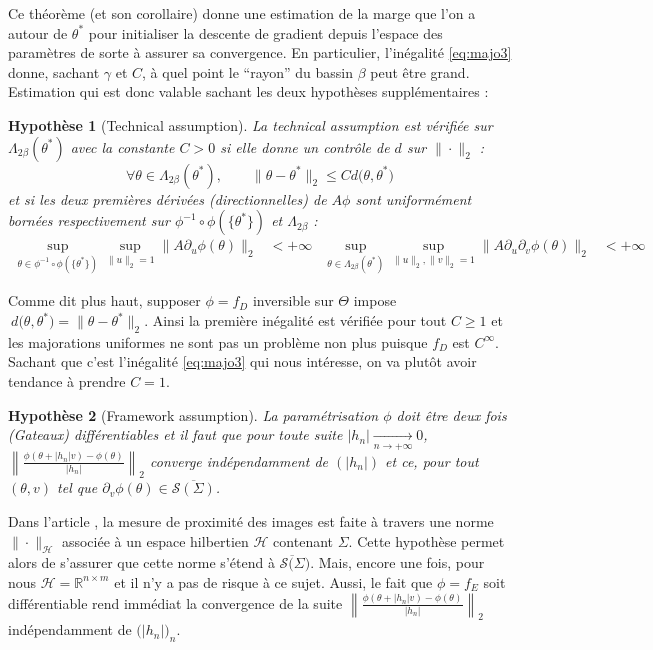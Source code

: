 \documentclass[hidelinks, french]{article} %
\newcommand{\R}{\mathbb{R}}
\newcommand{\lr}{\longrightarrow}
\renewcommand{\leq}{\leqslant}
\renewcommand{\geq}{\geqslant}
\theoremstyle{enonce}
\newtheorem{assump}{Hypothèse}
\theoremstyle{special}
\theoremstyle{rq}
\theoremstyle{exo}
\theoremstyle{demo}
\begin{document}
Ce théorème (et son corollaire) donne une estimation de la marge que l'on a autour de $\theta^*$ pour initialiser la descente de gradient depuis l'espace des paramètres de sorte à assurer sa convergence. En particulier, l'inégalité \ref{eq:majo3} donne, sachant $\gamma$ et $C$, à quel point le ``rayon'' du bassin $\beta$ peut être grand.
Estimation qui est donc valable sachant les deux hypothèses supplémentaires :
\\
\begin{assump}[Technical assumption]\label{hyp:technical}
	La \emph{technical assumption} est vérifiée sur $\Lambda_{2\beta}(\theta^*)$ avec la constante $C>0$ si elle donne un contrôle de $d$ sur $\|\cdot\|_2$ :
	\[\forall\theta\in\Lambda_{2\beta}(\theta^*),\qquad \big\|\theta-\theta^*\big\|_2\leq C d\big(\theta, \theta^*\big)\]
	et si les deux premières dérivées (directionnelles) de $A\phi$ sont uniformément bornées respectivement sur $\phi^{-1}\circ\phi(\{\theta^*\})$ et $\Lambda_{2\beta}$ :
	\begin{align*}\sup_{\theta\in\phi^{-1}\circ\phi(\{\theta^*\})}\sup_{\|u\|_2=1}\big\|A\partial_u\phi(\theta)\big\|_2&<+\infty  &  \sup_{\theta\in\Lambda_{2\beta}(\theta^*)}\sup_{\|u\|_2,\|v\|_2=1}\big\|A\partial_u\partial_v\phi(\theta)\big\|_2&<+\infty
	\end{align*}
\end{assump}

Comme dit plus haut, supposer $\phi=f_D$ inversible sur $\Theta$ impose $\ d\big(\theta, \theta^*\big)=\big\|\theta-\theta^*\big\|_2$. Ainsi la première inégalité est vérifiée pour tout $C\geq1$ et les majorations uniformes ne sont pas un problème non plus puisque $f_D$ est $C^\infty$. Sachant que c'est l'inégalité \ref{eq:majo3} qui nous intéresse, on va plutôt avoir tendance à prendre $C=1$.
\\

\begin{assump}[Framework assumption]\label{hyp:framework}
	La paramétrisation $\phi$ doit être deux fois (Gateaux) différentiables et il faut que pour toute suite $|h_n|\xrightarrow[n\lr+\infty]{} 0$, $\left\|\frac{\phi(\theta +|h_n|v)-\phi(\theta)}{|h_n|}\right\|_2$ converge indépendamment de $(|h_n|)$ et ce, pour tout $(\theta,v)$ tel que $\partial_v\phi(\theta)\in\overline{\mathcal{S}(\Sigma)}$.
\end{assump}

Dans l'article \cite{traonmilin_basins_2022}, la mesure de proximité des images est faite à travers une norme $\|\cdot\|_\mathcal{H}$ associée à un espace hilbertien $\mathcal{H}$ contenant $\Sigma$. Cette hypothèse permet alors de s'assurer que cette norme s'étend à $\overline{\mathcal{S}(\Sigma})$. Mais, encore une fois, pour nous $\mathcal{H}=\R^{n\times m}$ et il n'y a pas de risque à ce sujet. Aussi, le fait que $\phi=f_E$ soit différentiable rend immédiat la convergence de la suite $\left\|\frac{\phi(\theta +|h_n|v)-\phi(\theta)}{|h_n|}\right\|_2$ indépendamment de $\big(|h_n|\big)_n$.
\\ \\
\end{document}
